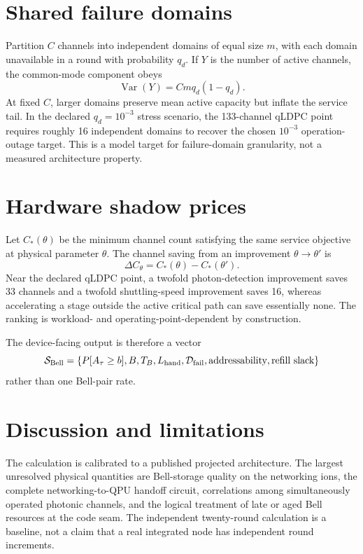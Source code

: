 \documentclass[aps,prx,reprint,superscriptaddress,nofootinbib,longbibliography,floatfix]{revtex4-2}
\begin{document}
\section{Shared failure domains}
Partition $C$ channels into independent domains of equal size $m$, with each domain unavailable in a round with probability $q_d$. If $Y$ is the number of active channels, the common-mode component obeys
\begin{equation}
\operatorname{Var}(Y)=Cm q_d(1-q_d).
\end{equation}
At fixed $C$, larger domains preserve mean active capacity but inflate the service tail. In the declared $q_d=10^{-3}$ stress scenario, the 133-channel qLDPC point requires roughly 16 independent domains to recover the chosen $10^{-3}$ operation-outage target. This is a model target for failure-domain granularity, not a measured architecture property.

\section{Hardware shadow prices}
Let $C_*(\theta)$ be the minimum channel count satisfying the same service objective at physical parameter $\theta$. The channel saving from an improvement $\theta\to\theta'$ is
\begin{equation}
\Delta C_\theta=C_*(\theta)-C_*(\theta').
\end{equation}
Near the declared qLDPC point, a twofold photon-detection improvement saves 33 channels and a twofold shuttling-speed improvement saves 16, whereas accelerating a stage outside the active critical path can save essentially none. The ranking is workload- and operating-point-dependent by construction.

The device-facing output is therefore a vector
\begin{equation}
\mathcal S_{\rm Bell}=\{P[A_\tau\ge b],B,T_B,L_{\rm hand},\mathcal D_{\rm fail},\text{addressability},\text{refill slack}\}
\end{equation}
rather than one Bell-pair rate.

\section{Discussion and limitations}
The calculation is calibrated to a published projected architecture. The largest unresolved physical quantities are Bell-storage quality on the networking ions, the complete networking-to-QPU handoff circuit, correlations among simultaneously operated photonic channels, and the logical treatment of late or aged Bell resources at the code seam. The independent twenty-round calculation is a baseline, not a claim that a real integrated node has independent round increments.
\end{document}
